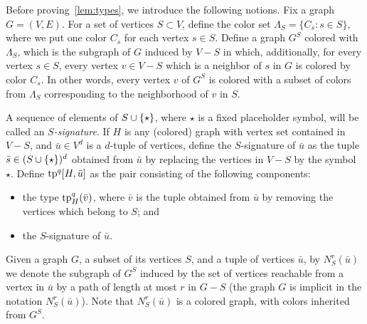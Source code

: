 Before proving~\cref{lem:types}, we introduce the following notions.
Fix a graph $G=(V,E)$.
For a set of vertices $S\subset V$, define the color set $\Lambda_S=\{C_s\colon s\in S\}$, where we put one color $C_s$ for each vertex $s\in S$.
Define a graph $G^S$ colored with $\Lambda_S$, which is 
the subgraph of $G$ induced by $V-S$
in which, additionally, for every vertex $s\in S$, every vertex $v\in V-S$ which is a neighbor of $s$ in $G$ is colored by color $C_s$. 
In other words, every vertex $v$ of $G^S$ is colored with a subset of colors from $\Lambda_S$ corresponding to the neighborhood of $v$ in $S$.

A sequence of elements of $S\cup\{\star\}$,
where $\star$ is a fixed placeholder symbol,
will be called an \emph{$S$-signature}.
If $H$ is any (colored) graph with vertex set contained in $V-S$,
and $\bar u\in V^d$ is a $d$-tuple of vertices,
define the {$S$-signature} of $\bar u$
as the tuple $\bar s\in (S\cup\{\star\})^d$ obtained from $\bar u$ by replacing the vertices in $V-S$ by the symbol~$\star$.
Define $\mathrm{tp}^q[H,\bar u]$ as the
pair consisting of the following components:
\begin{itemize}
	\item the type $\mathrm{tp}^q_H(\bar v)$,
	where $\bar v$ is the tuple obtained from $\bar u$
	by removing the vertices which belong to $S$; and
	\item the $S$-signature of $\bar u$.
\end{itemize}

Given a graph $G$, a subset of its vertices $S$, and a tuple of vertices $\bar u$,
by $N^r_S(\bar u)$ we denote the subgraph of $G^S$ induced by the set of vertices reachable from a vertex in $\bar u$ by a path of length at most $r$
in $G-S$ (the graph $G$ is implicit in the notation $N^r_S(\bar u)$). Note that $N^r_S(\bar u)$ is a colored graph, with colors inherited from $G^S$.

